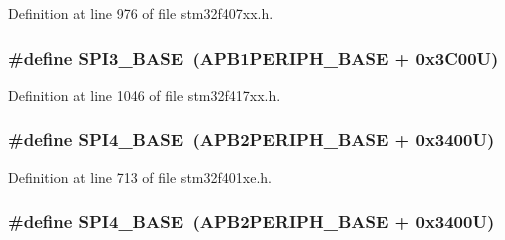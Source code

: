 Definition at line 976 of file stm32f407xx.\+h.

\subsubsection[{\texorpdfstring{S\+P\+I3\+\_\+\+B\+A\+SE}{SPI3_BASE}}]{\setlength{\rightskip}{0pt plus 5cm}\#define S\+P\+I3\+\_\+\+B\+A\+SE~({\bf A\+P\+B1\+P\+E\+R\+I\+P\+H\+\_\+\+B\+A\+SE} + 0x3\+C00\+U)}\hypertarget{group___peripheral__registers__structures_gae634fe8faa6922690e90fbec2fc86162}{}\label{group___peripheral__registers__structures_gae634fe8faa6922690e90fbec2fc86162}


Definition at line 1046 of file stm32f417xx.\+h.

\subsubsection[{\texorpdfstring{S\+P\+I4\+\_\+\+B\+A\+SE}{SPI4_BASE}}]{\setlength{\rightskip}{0pt plus 5cm}\#define S\+P\+I4\+\_\+\+B\+A\+SE~({\bf A\+P\+B2\+P\+E\+R\+I\+P\+H\+\_\+\+B\+A\+SE} + 0x3400\+U)}\hypertarget{group___peripheral__registers__structures_gac5cfaedf263cee1e79554665f921c708}{}\label{group___peripheral__registers__structures_gac5cfaedf263cee1e79554665f921c708}


Definition at line 713 of file stm32f401xe.\+h.

\subsubsection[{\texorpdfstring{S\+P\+I4\+\_\+\+B\+A\+SE}{SPI4_BASE}}]{\setlength{\rightskip}{0pt plus 5cm}\#define S\+P\+I4\+\_\+\+B\+A\+SE~({\bf A\+P\+B2\+P\+E\+R\+I\+P\+H\+\_\+\+B\+A\+SE} + 0x3400\+U)}\hypertarget{group___peripheral__registers__structures_gac5cfaedf263cee1e79554665f921c708}{}\label{group___peripheral__registers__structures_gac5cfaedf263cee1e79554665f921c708}


